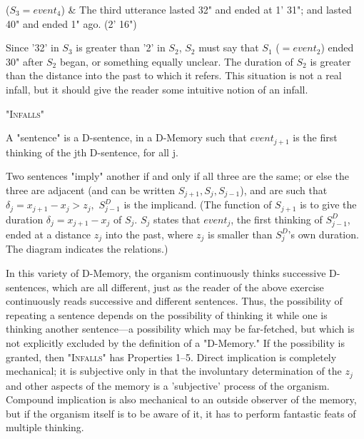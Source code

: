 \documentclass[10pt,twoside]{memoir}
\begin{document}
\begin{enumerate}
{\begin{enumerate}
\begin{sysrules}
\begin{sysrules}
\begin{sysrules}
\begin{tabular}
	($S_3=event_4$) & The third utterance lasted 32" and ended at 1' 31"; and lasted 40" and ended 1" ago. (2' 16") \\
\end{tabular}

Since '32' in $S_3$ is greater than '2' in $S_2$, $S_2$ must say that $S_1$ ($=event_2$)
ended 30" after $S_2$ began, or something equally unclear. The duration of $S_2$
is greater than the distance into the past to which it refers. This situation is 
not a real infall, but it should give the reader some intuitive notion of an 
infall. 


\newcommand{\midheading}[1]{
	{ \centering \large \textsc{#1} \par}}

\midheading{"Infalls"}

\begin{sysrules}
	A "sentence" is a D-sentence, in a D-Memory such that $event_{j+1}$ is the first 
thinking of the jth D-sentence, for all j. 

Two sentences "imply" another if and only if all three are the same; or else 
the three are adjacent (and can be written $S_{j+1},S_j,S_{j-1}$), and are such 
that $\delta_j=x_{j+1}-x_j\greater z_j,$ $S^D_{j-1}$ is the implicand. (The function of $S_{j+1}$ is to 
give the duration $\delta_j=x_{j+1}-x_j$ of $S_j$. $S_j$ states that $event_j$, the first 
thinking of $S^{D}_{j-1}$, ended at a distance $z_j$ into the past, where $z_j$ is smaller 
than $S^D_j$'s own duration. The diagram indicates the relations.) 


In this variety of D-Memory, the organism continuously thinks successive 
D-sentences, which are all different, just as the reader of the above exercise 
continuously reads successive and different sentences. Thus, the possibility 
of repeating a sentence depends on the possibility of thinking it while one is 
thinking another sentence---a possibility which may be far-fetched, but which 
is not explicitly excluded by the definition of a "D-Memory." If the 
possibility is granted, then "\textsc{Infalls}" has Properties 1--5. Direct implication is 
completely mechanical; it is subjective only in that the involuntary 
determination of the $z_j$ and other aspects of the memory is a 'subjective' 
process of the organism. Compound implication is also mechanical to an 
outside observer of the memory, but if the organism itself is to be aware of 
it, it has to perform fantastic feats of multiple thinking. 


\end{sysrules}
\end{sysrules}
\end{sysrules}
\end{sysrules}
\end{enumerate}}
\end{enumerate}
\end{document}
